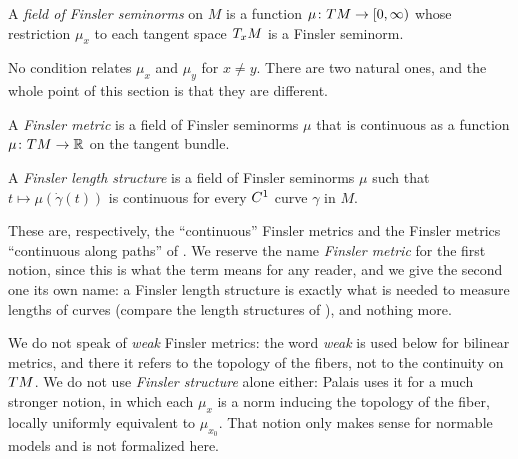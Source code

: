 \begin{definition}
  \label{def:mt-field}
  \leanok
  A \emph{field of Finsler seminorms} on $M$ is a function $\mu \colon T M \to [0,\infty)$ whose
  restriction $\mu_x$ to each tangent space $T_x M$ is a Finsler seminorm.
\end{definition}

No condition relates $\mu_x$ and $\mu_y$ for $x \neq y$. There are two natural ones, and the
whole point of this section is that they are different.

\begin{definition}
  \label{def:finsler-metric}
  \leanok
  A \emph{Finsler metric} is a field of Finsler seminorms $\mu$ that is continuous as a function
  $\mu \colon T M \to \mathbb{R}$ on the tangent bundle.
\end{definition}

\begin{definition}
  \label{def:finsler-length-structure}
  \leanok
  A \emph{Finsler length structure} is a field of Finsler seminorms $\mu$ such that
  $t \mapsto \mu(\dot\gamma(t))$ is continuous for every $C^{1}$ curve $\gamma$ in $M$.
\end{definition}

These are, respectively, the ``continuous'' Finsler metrics and the Finsler metrics ``continuous
along paths'' of \cite[Def.~2.3]{Lar19}. We reserve the name \emph{Finsler metric} for the first
notion, since this is what the term means for any reader, and we give the second one its own name:
a Finsler length structure is exactly what is needed to measure lengths of curves (compare the
length structures of \cite[\S2.1.1]{BBI01}), and nothing more.

\begin{remark}
  We do not speak of \emph{weak} Finsler metrics: the word \emph{weak} is used below for bilinear
  metrics, and there it refers to the topology of the fibers, not to the continuity on $T M$.
  We do not use \emph{Finsler structure} alone either: Palais \cite[Def.~2.1 and 2.6]{Pal66} uses
  it for a much stronger notion, in which each $\mu_x$ is a norm inducing the topology of the
  fiber, locally uniformly equivalent to $\mu_{x_0}$. That notion only makes sense for normable
  models and is not formalized here.
\end{remark}

